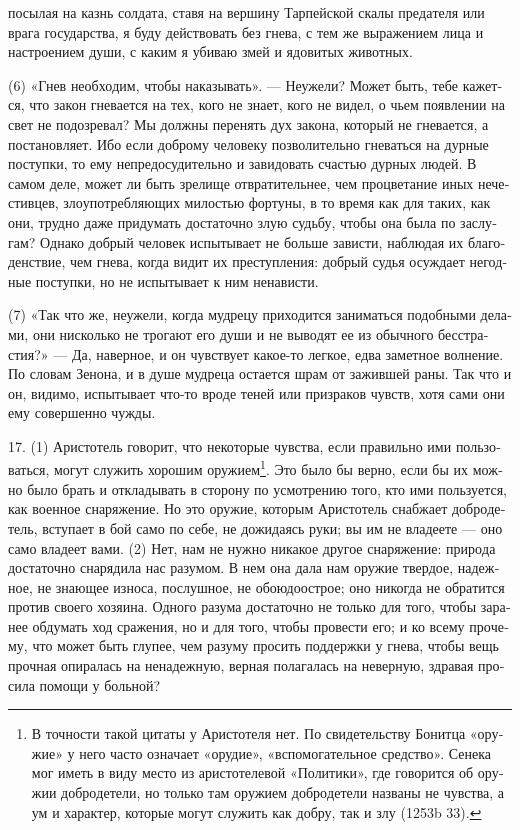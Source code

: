 посы­лая на казнь сол­да­та, ста­вя на вер­ши­ну Тар­пей­ской ска­лы пре­да­те­ля или вра­га государ­ства, я буду дей­ст­во­вать без гне­ва, с тем же выра­же­ни­ем лица и настро­е­ни­ем души, с каким я уби­ваю змей и ядо­ви­тых живот­ных.

(6) «Гнев необ­хо­дим, чтобы нака­зы­вать». --- Неуже­ли? Может быть, тебе кажет­ся, что закон гне­ва­ет­ся на тех, кого не зна­ет, кого не видел, о чьем появ­ле­нии на свет не подо­зре­вал? Мы долж­ны пере­нять дух зако­на, кото­рый не гне­ва­ет­ся, а поста­нов­ля­ет. Ибо если доб­ро­му чело­ве­ку поз­во­ли­тель­но гне­вать­ся на дур­ные поступ­ки, то ему непредо­суди­тель­но и завидо­вать сча­стью дур­ных людей. В самом деле, может ли быть зре­ли­ще отвра­ти­тель­нее, чем про­цве­та­ние иных нече­стив­цев, зло­употреб­ля­ю­щих мило­стью фор­ту­ны, в то вре­мя как для таких, как они, труд­но даже при­ду­мать доста­точ­но злую судь­бу, чтобы она была по заслу­гам? Одна­ко доб­рый чело­век испы­ты­ва­ет не боль­ше зави­сти, наблюдая их бла­го­ден­ст­вие, чем гне­ва, когда видит их пре­ступ­ле­ния: доб­рый судья осуж­да­ет негод­ные поступ­ки, но не испы­ты­ва­ет к ним нена­ви­сти.

(7) «Так что же, неуже­ли, когда муд­ре­цу при­хо­дит­ся зани­мать­ся подоб­ны­ми дела­ми, они нисколь­ко не тро­га­ют его души и не выво­дят ее из обыч­но­го бес­стра­стия?» --- Да, навер­ное, и он чув­ст­ву­ет какое-то лег­кое, едва замет­ное вол­не­ние. По сло­вам Зено­на, и в душе муд­ре­ца оста­ет­ся шрам от зажив­шей раны. Так что и он, види­мо, испы­ты­ва­ет что-то вро­де теней или при­зра­ков чувств, хотя сами они ему совер­шен­но чуж­ды.

17. (1) Ари­сто­тель гово­рит, что неко­то­рые чув­ства, если пра­виль­но ими поль­зо­вать­ся, могут слу­жить хоро­шим оружием\footnote{В точ­но­сти такой цита­ты у Ари­сто­те­ля нет. По свиде­тель­ству Бонит­ца «ору­жие» у него часто озна­ча­ет «орудие», «вспо­мо­га­тель­ное сред­ство». Сене­ка мог иметь в виду место из ари­сто­теле­вой «Поли­ти­ки», где гово­рит­ся об ору­жии доб­ро­де­те­ли, но толь­ко там ору­жи­ем доб­ро­де­те­ли назва­ны не чув­ства, а ум и харак­тер, кото­рые могут слу­жить как доб­ру, так и злу (1253b 33).}. Это было бы вер­но, если бы их мож­но было брать и откла­ды­вать в сто­ро­ну по усмот­ре­нию того, кто ими поль­зу­ет­ся, как воен­ное сна­ря­же­ние. Но это ору­жие, кото­рым Ари­сто­тель снаб­жа­ет доб­ро­де­тель, всту­па­ет в бой само по себе, не дожи­да­ясь руки; вы им не вла­де­е­те --- оно само вла­де­ет вами. (2) Нет, нам не нуж­но ника­кое дру­гое сна­ря­же­ние: при­ро­да доста­точ­но сна­ряди­ла нас разу­мом. В нем она дала нам ору­жие твер­дое, надеж­ное, не знаю­щее изно­са, послуш­ное, не обо­юдо­ост­рое; оно нико­гда не обра­тит­ся про­тив сво­его хозя­и­на. Одно­го разу­ма доста­точ­но не толь­ко для того, чтобы зара­нее обду­мать ход сра­же­ния, но и для того, чтобы про­ве­сти его; и ко все­му про­че­му, что может быть глу­пее, чем разу­му про­сить под­держ­ки у гне­ва, чтобы вещь проч­ная опи­ра­лась на нена­деж­ную, вер­ная пола­га­лась на невер­ную, здра­вая про­си­ла помо­щи у боль­ной?

